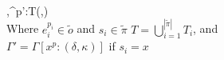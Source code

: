 \\[0.2cm]
	{\Gamma,\Pi{}^{p'}:T\sqcup(\delta,\kappa)}\\[0.3cm]
	Where $e_i^{p_i}\in\tilde{o}$ and $s_i\in\tilde{\pi}$ $T=\bigcup_{i=1}^{|\tilde{\pi}|}T_i$, and\\
	$\Gamma'=\Gamma[x^p:(\delta,\kappa)]$ if $s_i=x$
